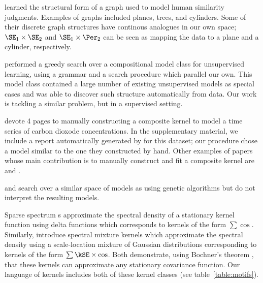 \citet{kemp2008discovery} learned the structural form of a graph used to model human similarity judgments.
Examples of graphs included planes, trees, and cylinders.
Some of their discrete graph structures have continous analogues in our own space; \eg $\SE_1 \times \SE_2$ and $\SE_1 \times \Per_2$ can be seen as mapping the data to a plane and a cylinder, respectively.

\citet{grosse2012exploiting} performed a greedy search over a compositional model class for unsupervised learning, using a grammar and a search procedure which parallel our own. This model class contained a large number of existing unsupervised models as special cases and was able to discover such structure automatically from data. Our work is tackling a similar problem, but in a supervised setting.


\cite{rasmussen38gaussian} devote 4 pages to manually constructing a composite kernel to model a time series of carbon dioxode concentrations.
In the supplementary material, we include a report automatically generated by \procedurename{} for this dataset; our procedure chose a model similar to the one they constructed by hand.
Other examples of papers whose main contribution is to manually construct and fit a composite \gp{} kernel are \cite{klenske2012nonparametric} and \cite{lloydgefcom2012}.

\citet{diosan2007evolving, bing2010gp} and \citet{kronberger2013evolution} search over a similar space of models as \procedurename{} using genetic algorithms but do not interpret the resulting models.



Sparse spectrum \gp{}s \citep{lazaro2010sparse} approximate the spectral density of a stationary kernel function using delta functions which corresponds to kernels of the form $\sum \cos$.
Similarly, \citet{WilAda13} introduce spectral mixture kernels which approximate the spectral density using a scale-location mixture of Gaussian distributions corresponding to kernels of the form $\sum \kSE \times \cos$.
Both demonstrate, using Bochner's theorem \citep{bochner1959lectures}, that these kernels can approximate any stationary covariance function.
Our language of kernels includes both of these kernel classes (see table~\ref{table:motifs}).

